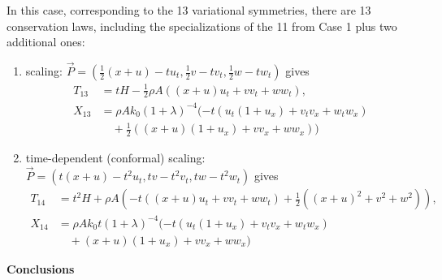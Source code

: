 \documentclass[landscape]{slides}
\begin{document}
\begin{itemize}
In this case, corresponding to the 13 variational symmetries, there are 13 conservation laws, including the specializations of the 11 from Case 1 plus two additional ones:
\begin{enumerate}[label=\roman*.]
\item 
scaling: $ \vec{P} = (\frac{1}{2} (x + u) - t u_t,
\frac{1}{2} v - t v_t,
\frac{1}{2} w - t w_t) $ gives
\[\begin{aligned}
T_{13} &= 
t H
-\frac{1}{2} \rho A ((x + u) u_t + v v_t + w w_t), \\
X_{13} &=  
\rho A k_0 (1 + \lambda)^{-4}
(
- t (u_t (1 + u_x) + v_t v_x + w_t w_x) \\ 
& \quad + \frac{1}{2} ((x + u) (1 + u_x) + v v_x + w w_x) 
)
\end{aligned}\]
\item 
time-dependent (conformal) scaling: $ \vec{P} = (t (x + u) - t^2 u_t,
t v - t^2 v_t,
t w - t^2 w_t)$ gives 
\[\begin{aligned}
T_{14} &= 
t^2 H
+ \rho A 
(
- t ((x + u) u_t + v v_t + w w_t)
+ \frac{1}{2} ((x + u)^2 + v^2 + w^2) 
), \\
X_{14} &= 
\rho A k_0 t (1 + \lambda)^{-4} 
(
- t  (u_t (1 + u_x) + v_t v_x + w_t w_x) \\
& \quad + (x + u) (1 + u_x) + v v_x + w w_x
)
\end{aligned}\]
\end{enumerate}
\end{itemize}

\newpage
\begin{center}
\textbf{Conclusions}
\end{center}
\end{document}
